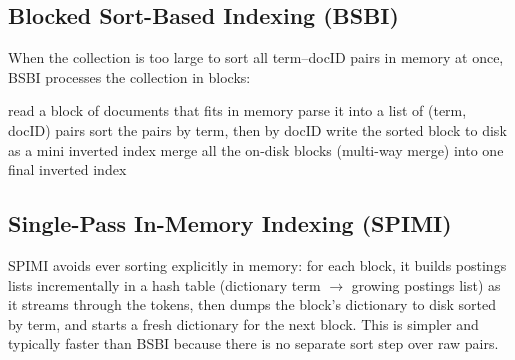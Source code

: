 \documentclass[11pt, a4paper]{article}
\begin{document}
\subsection{Blocked Sort-Based Indexing (BSBI)}

When the collection is too large to sort all term--docID pairs in memory at once, BSBI processes the collection in blocks:

\begin{algorithm}[H]
\caption{\textsc{BSBI-Indexing}}
\begin{algorithmic}[1]
  \State read a block of documents that fits in memory
  \State parse it into a list of (term, docID) pairs
  \State sort the pairs by term, then by docID
  \State write the sorted block to disk as a mini inverted index
\EndWhile
\State merge all the on-disk blocks (multi-way merge) into one final inverted index
\end{algorithmic}
\end{algorithm}

\subsection{Single-Pass In-Memory Indexing (SPIMI)}

SPIMI avoids ever sorting explicitly in memory: for each block, it builds postings lists incrementally in a hash table (dictionary term $\to$ growing postings list) as it streams through the tokens, then dumps the block's dictionary to disk sorted by term, and starts a fresh dictionary for the next block. This is simpler and typically faster than BSBI because there is no separate sort step over raw pairs.
\end{document}
